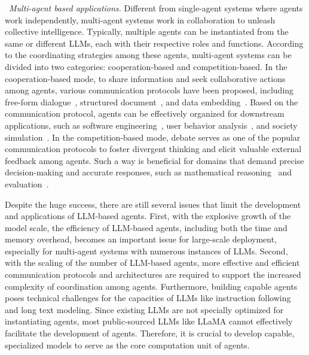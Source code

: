 {\textbullet~\emph{Multi-agent based applications.}
{
Different from single-agent systems where agents work independently, multi-agent systems work in collaboration to unleash collective intelligence.
Typically, multiple agents can be instantiated from the same or different LLMs, each with their respective roles and functions.
According to the coordinating strategies among these agents, multi-agent systems can be divided into two categories: cooperation-based and competition-based. 
In the cooperation-based mode, to share information and seek collaborative actions among agents, various communication protocols have been proposed, including {free-form dialogue~\cite{Li-arxiv-2023-CAMEL}, structured document~\cite{Hone-arxiv-2023-MetaGPT}, and data embedding~\cite{Pham-arxiv-2023-Let}.}
Based on the communication protocol, agents can be effectively organized for downstream applications, such as software engineering~\cite{Hone-arxiv-2023-MetaGPT}, user behavior analysis~\cite{Wang-arxiv-2023-RecAgent, Zhang-arxiv-2023-AgentCF}, and society simulation~\cite{Park-arxiv-2023-Generative}.
In the competition-based mode, debate serves as one of the popular communication protocols to foster divergent thinking and elicit valuable external feedback among agents.
Such a way is beneficial for domains that demand precise decision-making and accurate responses, such as mathematical reasoning~\cite{Du-arxiv-2023-Improving} and evaluation~\cite{Chan-arixiv-2023-ChatEval}.
}

{
Despite the huge success, there are still several issues that limit the development and applications of LLM-based agents. 
First, with the explosive growth of the model scale, the efficiency of LLM-based agents, including both the time and memory overhead, becomes an important issue for large-scale deployment, especially for multi-agent systems with numerous instances of LLMs. 
Second, with the scaling of the number of LLM-based agents, more effective and efficient communication protocols and architectures are required to support the increased complexity of coordination among agents.
Furthermore, building capable agents poses technical challenges for the capacities of LLMs like instruction following and long text modeling. 
Since existing LLMs are not specially optimized for instantiating agents, most public-sourced LLMs like LLaMA cannot effectively facilitate the development of agents. 
Therefore, it is crucial to develop capable, specialized models to serve as the core computation unit of agents. 
}

}

